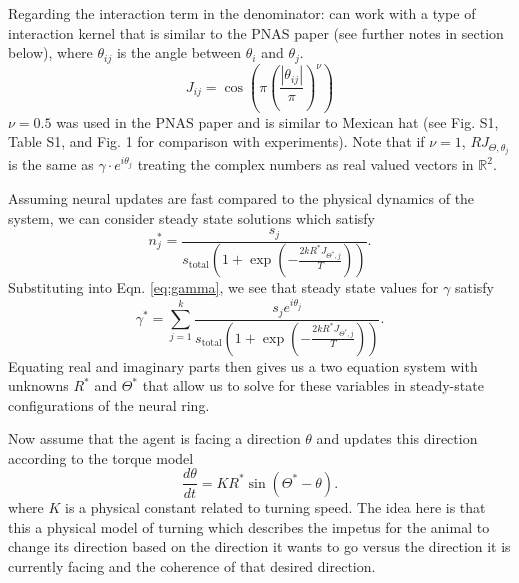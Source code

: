 \documentclass[12pt]{article}
\begin{document}
Regarding the interaction term in the denominator: can work with a type of interaction kernel that is similar to the PNAS paper (see further notes in section below), where $\theta_{ij}$ is the angle between $\theta_i$ and $\theta_j$.
\[
J_{ij} = \cos\left(\pi\left(\frac{|\theta_{ij}|}{\pi}\right)^\nu\right)
\]
$\nu=0.5$ was used in the PNAS paper and is similar to Mexican hat (see Fig. S1, Table S1, and Fig. 1 for comparison with experiments). Note that if $\nu=1$, $RJ_{\Theta,\theta_j}$ is the same as $\gamma\cdot e^{i\theta_j}$ treating the complex numbers as real valued vectors in $\mathbb{R}^2$.

Assuming neural updates are fast compared to the physical dynamics of the system, we can consider steady state solutions which satisfy
\begin{equation}
	n_j^* = \frac{s_j}{s_{\text{total}}\left(1+\exp\left(-\frac{2kR^*J_{\Theta^*,j}}{T}\right)\right)}.
	\label{eq:steadystate}
\end{equation}
Substituting into Eqn. \eqref{eq:gamma}, we see that steady state values for $\gamma$ satisfy
\begin{equation}
\gamma^* = \sum_{j=1}^{k}\frac{s_j e^{i\theta_j}}{s_{\text{total}}\left(1+\exp\left(-\frac{2kR^*J_{\Theta^*,j}}{T}\right)\right)}.
\label{eq:model}
\end{equation}
Equating real and imaginary parts then gives us a two equation system with unknowns $R^*$ and $\Theta^*$ that allow us to solve for these variables in steady-state configurations of the neural ring.

Now assume that the agent is facing a direction $\theta$ and updates this direction according to the torque model
\begin{equation}
\frac{d\theta}{dt} = KR^*\sin(\Theta^* - \theta).\label{eq:torqemodel}
\end{equation}
where $K$ is a physical constant related to turning speed. The idea here is that this a physical model of turning which describes the impetus for the animal to change its direction based on the direction it wants to go versus the direction it is currently facing and the coherence of that desired direction. 
\end{document}
